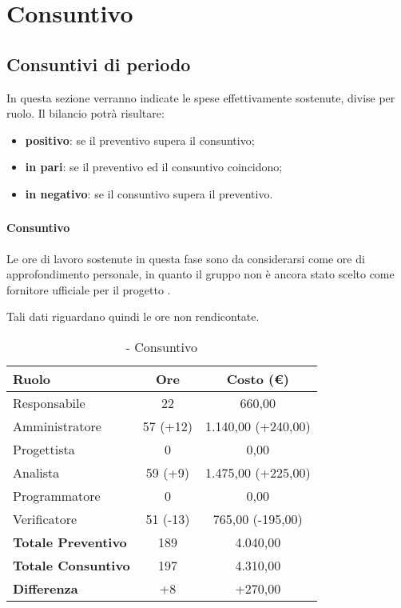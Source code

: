 \documentclass[./PianoDiProgetto.tex]{subfiles}
\begin{document}
\section{Consuntivo}
\subsection{Consuntivi di periodo}
In questa sezione verranno indicate le spese effettivamente sostenute, divise per ruolo. Il bilancio potrà risultare:
\begin{itemize}
  \item \textbf{positivo}: se il preventivo supera il consuntivo;
  \item \textbf{in pari}: se il preventivo ed il consuntivo coincidono;
  \item \textbf{in negativo}: se il consuntivo supera il preventivo.
\end{itemize}
\subsubsection{\PerAR}
	\paragraph{Consuntivo}
Le ore di lavoro sostenute in questa fase sono da considerarsi come ore di approfondimento personale, in quanto il gruppo \GRUPPO{} non è ancora stato scelto come fornitore ufficiale per il progetto \PROGETTO.
		
		Tali dati riguardano quindi le ore non rendicontate.

\begin{table}[h]
		\centering
		\begin{tabular}{l * {2}{c}}
			\toprule
			\textbf{Ruolo} & \textbf{Ore} & \textbf{Costo (\euro{})} \\
			\midrule
			Responsabile &	22 & 660,00 \\
			Amministratore & 57 (+12) & 1.140,00 (+240,00)\\
			Progettista & 0 & 0,00 \\
			Analista & 59 (+9) & 1.475,00 (+225,00)\\
			Programmatore & 0 & 0,00 \\
			Verificatore & 51 (-13) & 765,00 (-195,00)\\
			\midrule
			\textbf{Totale Preventivo} & 189
 & 4.040,00
 \\		
			\textbf{Totale Consuntivo} & 197 & 4.310,00
 \\
			\midrule
			\textbf{Differenza} & +8 & +270,00 \\
			\bottomrule
		\end{tabular}
		\caption{\PerAR{} - Consuntivo}
		\label{tab:consuntivoA}
		
	\end{table}		
		
\end{document}
